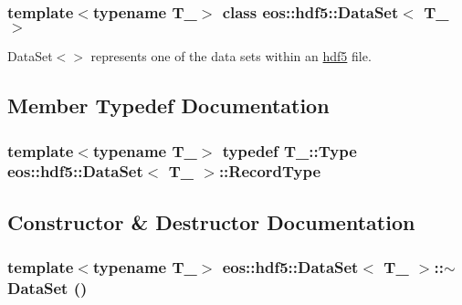 \subsubsection*{template$<$typename T\_\-$>$ class eos::hdf5::DataSet$<$ T\_\- $>$}

DataSet$<$$>$ represents one of the data sets within an \hyperlink{namespaceeos_1_1hdf5}{hdf5} file. 

\subsection{Member Typedef Documentation}
\hypertarget{classeos_1_1hdf5_1_1DataSet_a010bb09725c4d84df2db7f60e0a88a1f}{
\subsubsection[{RecordType}]{\setlength{\rightskip}{0pt plus 5cm}template$<$typename T\_\-$>$ typedef T\_\-::Type {\bf eos::hdf5::DataSet}$<$ T\_\- $>$::{\bf RecordType}}}
\label{classeos_1_1hdf5_1_1DataSet_a010bb09725c4d84df2db7f60e0a88a1f}


\subsection{Constructor \& Destructor Documentation}
\hypertarget{classeos_1_1hdf5_1_1DataSet_a29e516f3d4d7e3a8375fe676f73715ec}{
\subsubsection[{$\sim$DataSet}]{\setlength{\rightskip}{0pt plus 5cm}template$<$typename T\_\-$>$ {\bf eos::hdf5::DataSet}$<$ T\_\- $>$::$\sim${\bf DataSet} ()}}
\label{classeos_1_1hdf5_1_1DataSet_a29e516f3d4d7e3a8375fe676f73715ec}


